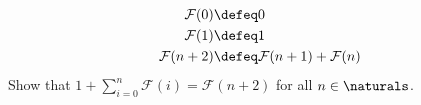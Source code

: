 \begin{enumerate}
    \begin{align*}
        \mathcal{F}(0) &\defeq 0 \\
        \mathcal{F}(1) &\defeq 1 \\
        \mathcal{F}(n + 2) &\defeq \mathcal{F}(n + 1) + \mathcal{F}(n)
    \end{align*}
    Show that $1 + \displaystyle\sum_{i = 0}^{n}\mathcal{F}(i) = \mathcal{F}(n + 2)$ for all $n \in \naturals$.

\end{enumerate}


